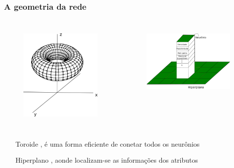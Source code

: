 \documentclass[aspectratio=10]{beamer} %
\begin{document}
\begin{frame}
	\frametitle{A geometria da rede}
	
	\begin{columns}
		\begin{figure}[H]
			\flushleft
			\includegraphics[scale=0.2]{Imagens/toro.png}
			\label{toro}
		\end{figure}
		\begin{figure}
			\flushright
			\includegraphics[scale=0.3]{Imagens/hiperplano.png}
			\label{hiperplano}
		\end{figure}
	\end{columns}
	\pause
	\begin{itemize}
		\footnotesize
		\centering
		\item[Toroide], é uma forma eficiente de conetar todos os neurônios
		\item[Hiperplano], aonde localizam-se as informações dos atributos
	\end{itemize}
\end{frame}
\end{document}
